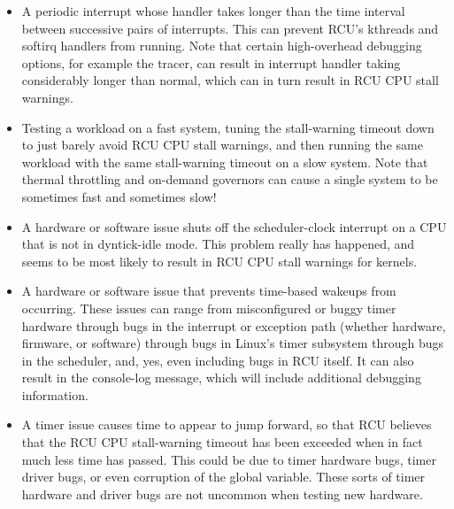 \begin{itemize}
	You can use the  kernel boot parameter to
	increase the scheduling priority of RCU's kthreads, which can
	help avoid this problem.
	However, please note that doing this
	can increase your system's context-switch rate and thus degrade
	performance.

\item	A periodic interrupt whose handler takes longer than the time
	interval between successive pairs of interrupts.
	This can
	prevent RCU's kthreads and softirq handlers from running.
	Note that certain high-overhead debugging options, for example
	the  tracer, can result in interrupt handler taking
	considerably longer than normal, which can in turn result in
	RCU CPU stall warnings.

\item	Testing a workload on a fast system, tuning the stall-warning
	timeout down to just barely avoid RCU CPU stall warnings, and then
	running the same workload with the same stall-warning timeout on a
	slow system.
	Note that thermal throttling and on-demand governors
	can cause a single system to be sometimes fast and sometimes slow!

\item	A hardware or software issue shuts off the scheduler-clock
	interrupt on a CPU that is not in dyntick-idle mode.
	This
	problem really has happened, and seems to be most likely to
	result in RCU CPU stall warnings for  kernels.

\item	A hardware or software issue that prevents time-based wakeups
	from occurring.
	These issues can range from misconfigured or
	buggy timer hardware through bugs in the interrupt or exception
	path (whether hardware, firmware, or software) through bugs
	in Linux's timer subsystem through bugs in the scheduler, and,
	yes, even including bugs in RCU itself.
	It can also result in
	the  console-log message,
	which will include additional debugging information.

\item   A timer issue causes time to appear to jump forward, so that RCU
	believes that the RCU CPU stall-warning timeout has been exceeded
	when in fact much less time has passed.
	This could be due to timer hardware bugs, timer driver bugs, or
        even corruption of the  global variable.
	These sorts of timer hardware and driver bugs are not uncommon
	when testing new hardware.


\end{itemize}
